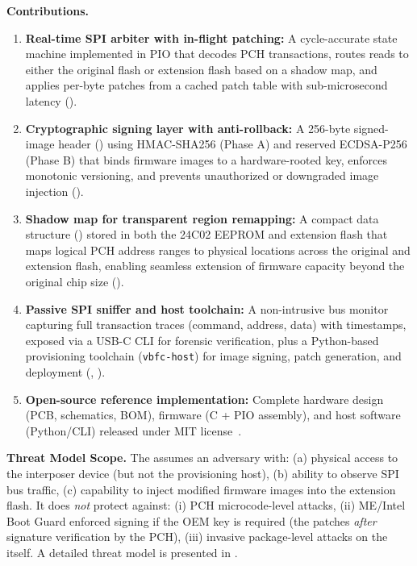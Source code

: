 \noindent\textbf{Contributions.}
\begin{enumerate}
    \item \textbf{Real-time \ac{SPI} arbiter with in-flight patching:} A cycle-accurate state machine implemented in \rp \ac{PIO} that decodes \ac{PCH} transactions, routes reads to either the original flash or extension flash based on a shadow map, and applies per-byte patches from a cached patch table with sub-microsecond latency ().
    
    \item \textbf{Cryptographic signing layer with anti-rollback:} A 256-byte signed-image header () using \ac{HMAC}-\ac{SHA}256 (Phase A) and reserved ECDSA-P256 (Phase B) that binds firmware images to a hardware-rooted key, enforces monotonic versioning, and prevents unauthorized or downgraded image injection ().
    
    \item \textbf{Shadow map for transparent region remapping:} A compact data structure () stored in both the 24C02 \ac{EEPROM} and extension flash that maps logical \ac{PCH} address ranges to physical locations across the original and extension flash, enabling seamless extension of firmware capacity beyond the original chip size ().
    
    \item \textbf{Passive \ac{SPI} sniffer and host toolchain:} A non-intrusive bus monitor capturing full transaction traces (command, address, data) with timestamps, exposed via a USB-C \ac{CLI} for forensic verification, plus a Python-based provisioning toolchain (\texttt{vbfc-host}) for image signing, patch generation, and deployment (, ).
    
    \item \textbf{Open-source reference implementation:} Complete hardware design (\ac{PCB}, schematics, BOM), \rp firmware (C + \ac{PIO} assembly), and host software (Python/CLI) released under MIT license~\cite{vbfc-github}.
\end{enumerate}

\noindent\textbf{Threat Model Scope.}
The \vbfc assumes an adversary with: (a) physical access to the interposer device (but not the provisioning host), (b) ability to observe \ac{SPI} bus traffic, (c) capability to inject modified firmware images into the extension flash. It does \textit{not} protect against: (i) \ac{PCH} microcode-level attacks, (ii) \ac{ME}/Intel Boot Guard enforced signing if the OEM key is required (the \vbfc patches \textit{after} signature verification by the \ac{PCH}), (iii) invasive package-level attacks on the \rp itself. A detailed threat model is presented in .

